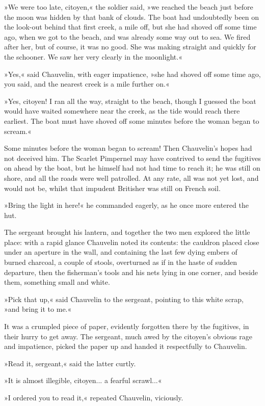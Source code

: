»We were too late, citoyen,« the soldier said, »we reached the beach just before the moon was hidden by that bank of clouds. The boat had undoubtedly been on the look-out behind that first creek, a mile off, but she had shoved off some time ago, when we got to the beach, and was already some way out to sea. We fired after her, but of course, it was no good. She was making straight and quickly for the schooner. We saw her very clearly in the moonlight.«

»Yes,« said Chauvelin, with eager impatience, »she had shoved off some time ago, you said, and the nearest creek is a mile further on.«

»Yes, citoyen! I ran all the way, straight to the beach, though I guessed the boat would have waited somewhere near the creek, as the tide would reach there earliest. The boat must have shoved off some minutes before the woman began to scream.«

Some minutes before the woman began to scream! Then Chauvelin's hopes had not deceived him. The Scarlet Pimpernel may have contrived to send the fugitives on ahead by the boat, but he himself had not had time to reach it; he was still on shore, and all the roads were well patrolled. At any rate, all was not yet lost, and would not be, whilst that impudent Britisher was still on French soil.

»Bring the light in here!« he commanded eagerly, as he once more entered the hut.

The sergeant brought his lantern, and together the two men explored the little place: with a rapid glance Chauvelin noted its contents: the cauldron placed close under an aperture in the wall, and containing the last few dying embers of burned charcoal, a couple of stools, overturned as if in the haste of sudden departure, then the fisherman's tools and his nets lying in one corner, and beside them, something small and white.

»Pick that up,« said Chauvelin to the sergeant, pointing to this white scrap, »and bring it to me.«

It was a crumpled piece of paper, evidently forgotten there by the fugitives, in their hurry to get away. The sergeant, much awed by the citoyen's obvious rage and impatience, picked the paper up and handed it respectfully to Chauvelin.

»Read it, sergeant,« said the latter curtly.

»It is almost illegible, citoyen... a fearful scrawl...«

»I ordered you to read it,« repeated Chauvelin, viciously.

